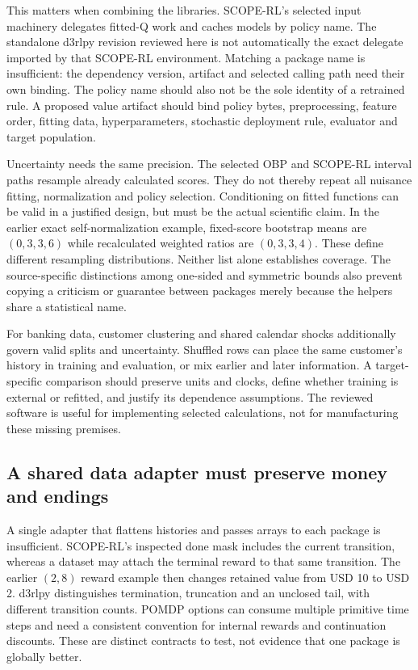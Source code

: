 This matters when combining the libraries. SCOPE-RL's selected input machinery
delegates fitted-Q work and caches models by policy name. The standalone d3rlpy
revision reviewed here is not automatically the exact delegate imported by that
SCOPE-RL environment. Matching a package name is insufficient: the dependency
version, artifact and selected calling path need their own binding. The policy
name should also not be the sole identity of a retrained rule. A proposed value
artifact should bind policy bytes, preprocessing, feature order, fitting data,
hyperparameters, stochastic deployment rule, evaluator and target population.
\citep{exec23_scope_rl_sources,exec15_d3rlpy_contract}

Uncertainty needs the same precision. The selected OBP and SCOPE-RL interval
paths resample already calculated scores. They do not thereby repeat all nuisance
fitting, normalization and policy selection. Conditioning on fitted functions can
be valid in a justified design, but must be the actual scientific claim. In the
earlier exact self-normalization example, fixed-score bootstrap means are
$(0,3,3,6)$ while recalculated weighted ratios are $(0,3,3,4)$. These define
different resampling distributions. Neither list alone establishes coverage.
The source-specific distinctions among one-sided and symmetric bounds also
prevent copying a criticism or guarantee between packages merely because the
helpers share a statistical name.~\citep{exec23_obp_sources,
exec23_scope_rl_sources,exec23_scope_rl_reference}

For banking data, customer clustering and shared calendar shocks additionally
govern valid splits and uncertainty. Shuffled rows can place the same customer's
history in training and evaluation, or mix earlier and later information. A
target-specific comparison should preserve units and clocks, define whether
training is external or refitted, and justify its dependence assumptions. The
reviewed software is useful for implementing selected calculations, not for
manufacturing these missing premises.

\subsection{A shared data adapter must preserve money and endings}

A single adapter that flattens histories and passes arrays to each package is
insufficient. SCOPE-RL's inspected done mask includes the current transition,
whereas a dataset may attach the terminal reward to that same transition. The
earlier $(2,8)$ reward example then changes retained value from USD 10 to USD 2.
d3rlpy distinguishes termination, truncation and an unclosed tail, with different
transition counts. POMDP options can consume multiple primitive time steps and
need a consistent convention for internal rewards and continuation discounts.
These are distinct contracts to test, not evidence that one package is globally
better.~\citep{exec23_scope_rl_sources,exec23_scope_rl_reference,
exec15_d3rlpy_episode,exec23_pomdppy_sources}

